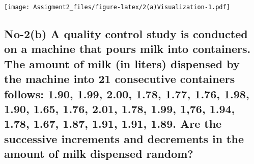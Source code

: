 \documentclass[
]{article}
\newenvironment{Shaded}{\begin{snugshade}}{\end{snugshade}}
\newcommand{\AttributeTok}[1]{\textcolor[rgb]{0.13,0.29,0.53}{#1}}
\newcommand{\CommentTok}[1]{\textcolor[rgb]{0.56,0.35,0.01}{\textit{#1}}}
\newcommand{\DecValTok}[1]{\textcolor[rgb]{0.00,0.00,0.81}{#1}}
\newcommand{\FunctionTok}[1]{\textcolor[rgb]{0.13,0.29,0.53}{\textbf{#1}}}
\newcommand{\NormalTok}[1]{#1}
\newcommand{\SpecialCharTok}[1]{\textcolor[rgb]{0.81,0.36,0.00}{\textbf{#1}}}
\newcommand{\StringTok}[1]{\textcolor[rgb]{0.31,0.60,0.02}{#1}}
\begin{document}
\begin{Shaded}
\end{Shaded}

\texttt{[image: Assigment2\_files/figure-latex/2(a)Visualization-1.pdf]}

\subsection{No-2(b) A quality control study is conducted on a machine
that pours milk into containers. The amount of milk (in liters)
dispensed by the machine into 21 consecutive containers follows: 1.90,
1.99, 2.00, 1.78, 1.77, 1.76, 1.98, 1.90, 1.65, 1.76, 2.01, 1.78, 1.99,
1,76, 1.94, 1.78, 1.67, 1.87, 1.91, 1.91, 1.89. Are the successive
increments and decrements in the amount of milk dispensed
random?}\label{no-2b-a-quality-control-study-is-conducted-on-a-machine-that-pours-milk-into-containers.-the-amount-of-milk-in-liters-dispensed-by-the-machine-into-21-consecutive-containers-follows-1.90-1.99-2.00-1.78-1.77-1.76-1.98-1.90-1.65-1.76-2.01-1.78-1.99-176-1.94-1.78-1.67-1.87-1.91-1.91-1.89.-are-the-successive-increments-and-decrements-in-the-amount-of-milk-dispensed-random}
\end{document}
